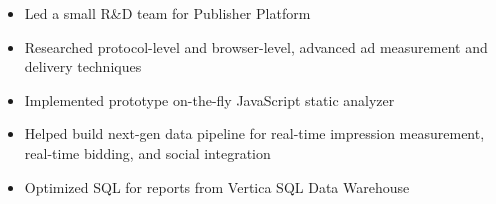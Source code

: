 \documentclass[10pt,a4paper,ragged2e,withhyper]{altacv}
\begin{document}
\begin{paracol}{2}
  \divider
  
  \begin{itemize}
    \item Led a small R\&D team for Publisher Platform
    \item Researched protocol-level and browser-level, advanced ad measurement and delivery techniques
    \item Implemented prototype on-the-fly JavaScript static analyzer
    \item Helped build next-gen data pipeline for real-time impression measurement, real-time bidding, and social integration
    \item Optimized SQL for reports from Vertica SQL Data Warehouse
  \end{itemize}
  
  
  
  
  

\end{paracol}
\end{document}
